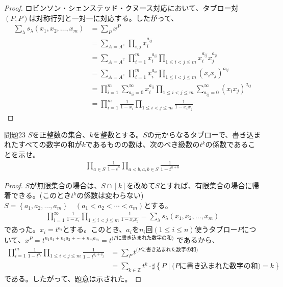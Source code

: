 \documentclass[a4paper,11pt]{jsarticle}
\theoremstyle{plain}
\theoremstyle{definition}
\renewcommand{\(}{\left(}
\renewcommand{\)}{\right)}
\renewcommand{\[}{\left[}
\renewcommand{\]}{\right]}
\renewcommand{\{}{\left\lbrace}
\renewcommand{\}}{\right\rbrace}
\newcommand{\Z}{\mathbb{Z}}
\begin{document}
\begin{proof}
    ロビンソン・シェンステッド・クヌース対応において、タブロー対$(P,P)$は対称行列と一対一に対応する。したがって、
    \begin{align*}
        \sum_{\lambda} s_{\lambda}(x_1, x_2, \ldots, x_m) &= \sum_{P} x^P \\
        &= \sum_{A = A^{\top}} \prod_{i,j} x_i^{a_{ij}} \\
        &= \sum_{A = A^{\top}} \prod_{i=1}^{m} x_i^{a_{ii}} \prod_{1 \leq i < j \leq m} x_i^{a_{ij}} x_j^{a_{ji}} \\
        &= \sum_{A = A^{\top}} \prod_{i=1}^{m} x_i^{a_{ii}} \prod_{1 \leq i < j \leq m} (x_i x_j)^{a_{ij}} \\
        &= \prod_{i=1}^{m} \sum_{a_{ii}=0}^{\infty} x_i^{a_{ii}} \prod_{1 \leq i < j \leq m} \sum_{a_{ij}=0}^{\infty} (x_i x_j)^{a_{ij}} \\
        &= \prod_{i=1}^{m} \frac{1}{1-x_i} \prod_{1 \leq i < j \leq m} \frac{1}{1-x_i x_j}
    \end{align*}
\end{proof}

\begin{itembox}[l]{問題23}
    $S$を正整数の集合、$k$を整数とする。$S$の元からなるタブローで、書き込まれたすべての数字の和が$k$であるものの数は、次のべき級数の$t^k$の係数であることを示せ。
    \begin{align*}
        \prod_{a \in S} \frac{1}{1-t^a} \prod_{a<b, a,b \in S} \frac{1}{1-t^{a+b}}
    \end{align*}
\end{itembox}

\begin{proof}
    $S$が無限集合の場合は、$S\cap [k]$を改めて$S$とすれば、有限集合の場合に帰着できる。(このとき$t^k$の係数は変わらない)
    $S=\{a_1, a_2, \ldots, a_m\} \quad (a_1 < a_2 < \cdots < a_m)$とする。
    \begin{align*}
        \prod_{i=1}^{\infty} \frac{1}{1-x_i} \prod_{1 \leq i < j \leq m} \frac{1}{1-x_i x_j} = \sum_{\lambda} s_{\lambda}(x_1, x_2, \ldots, x_m)
    \end{align*}
    であった。$x_i = t^{a_i}$とする。このとき、$a_i$を$n_i$回$(1\leq i \leq n)$使うタブロー$P$について、$x^P = t^{n_1 a_1 + n_2 a_2 + \cdots + n_m a_m} = t^{\text{($P$に書き込まれた数字の和)}}$
    であるから、
    \begin{align*}
        \prod_{i=1}^{m} \frac{1}{1-t^{a_i}} \prod_{1 \leq i < j \leq m} \frac{1}{1-t^{a_i + a_j}} &= \sum_{P} t^{\text{($P$に書き込まれた数字の和)}} \\
        &= \sum_{k\in \Z} t^k \cdot \sharp \{ P \mid \text{($P$に書き込まれた数字の和)} = k \}
    \end{align*}
    である。したがって、題意は示された。
\end{proof}
\end{document}

